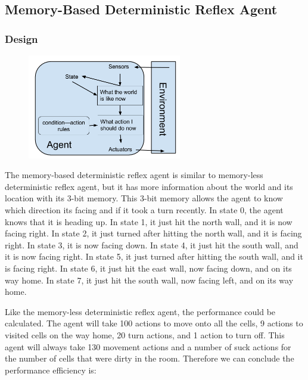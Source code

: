 \documentclass[a4paper,10pt]{article}
\begin{document}
\subsection{Memory-Based Deterministic Reflex Agent}
\subsubsection{Design}
\begin{figure}[H]
	\begin{center}
		\includegraphics[width=0.6\textwidth]{MemoryReflex.png}
	\end{center}
\end{figure}

The memory-based deterministic reflex agent is similar to memory-less deterministic reflex agent, but it has more information about the world and its location with its 3-bit memory. 
This 3-bit memory allows the agent to know which direction its facing and if it took a turn recently.
In state 0, the agent knows that it is heading up.
In state 1, it just hit the north wall, and it is now facing right.
In state 2, it just turned after hitting the north wall, and it is facing right.
In state 3, it is now facing down. 
In state 4, it just hit the south wall, and it is now facing right.
In state 5, it just turned after hitting the south wall, and it is facing right.
In state 6, it just hit the east wall, now facing down, and on its way home.
In state 7, it just hit the south wall, now facing left, and on its way home.

Like the memory-less deterministic reflex agent, the performance could be calculated.
The agent will take 100 actions to move onto all the cells, 9 actions to visited cells on the way home, 20 turn actions, and 1 action to turn off. 
This agent will always take 130 movement actions and a number of suck actions for the number of cells that were dirty in the room. 
Therefore we can conclude the performance efficiency is:
\end{document}
